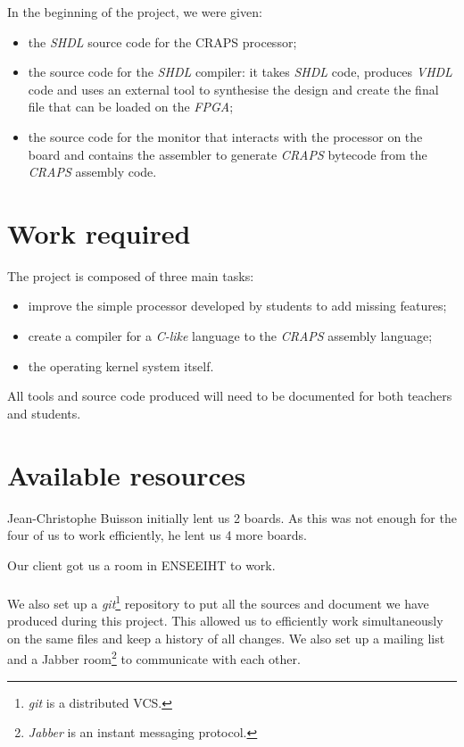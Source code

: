 \documentclass[openany, a4paper]{book}
\begin{document}
      In the beginning of the project, we were given:
      \begin{itemize}
        \item the \emph{SHDL} source code for the CRAPS processor;
        \item the source code for the \emph{SHDL} compiler: it takes \emph{SHDL}
          code, produces \emph{VHDL} code and uses an external tool to
          synthesise the design and create the final file that can be loaded on
          the \emph{FPGA};
        \item the source code for the monitor that interacts with the processor
          on the board and contains the assembler to generate \emph{CRAPS}
          bytecode from the \emph{CRAPS} assembly code.
      \end{itemize}

    \section{Work required}
      The project is composed of three main tasks:
      \begin{itemize}
        \item improve the simple processor developed by students to add missing
          features;
        \item create a compiler for a \textit{C-like} language to the
          \emph{CRAPS} assembly language;
        \item the operating kernel system itself.
      \end{itemize}

      All tools and source code produced will need to be documented for both
      teachers and students.

    \section{Available resources}
      Jean-Christophe Buisson initially lent us 2 boards. As this was not enough
      for the four of us to work efficiently, he lent us 4 more boards.

      Our client got us a room in ENSEEIHT to work.

      \paragraph{}
      We also set up a \textit{git}\footnote{\textit{git} is a distributed
      VCS.} repository to put all the sources and
      document we have produced during this project. This allowed us to
      efficiently work simultaneously on the same files and keep a history of
      all changes.  We also set up a mailing list and a Jabber
      room\footnote{\textit{Jabber} is an instant messaging protocol.} to
      communicate with each other.
\end{document}
